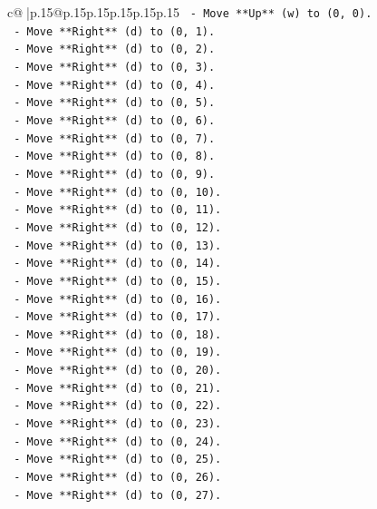 \documentclass{article}
\begin{document}
{\begin{supertabular}{c@{$\;$}|p{.15\linewidth}@{}p{.15\linewidth}p{.15\linewidth}p{.15\linewidth}p{.15\linewidth}p{.15\linewidth}}
{{{\texttt{        {-} Move **Up** (w) to (0, 0).} \\
\texttt{        {-} Move **Right** (d) to (0, 1).} \\
\texttt{        {-} Move **Right** (d) to (0, 2).} \\
\texttt{        {-} Move **Right** (d) to (0, 3).} \\
\texttt{        {-} Move **Right** (d) to (0, 4).} \\
\texttt{        {-} Move **Right** (d) to (0, 5).} \\
\texttt{        {-} Move **Right** (d) to (0, 6).} \\
\texttt{        {-} Move **Right** (d) to (0, 7).} \\
\texttt{        {-} Move **Right** (d) to (0, 8).} \\
\texttt{        {-} Move **Right** (d) to (0, 9).} \\
\texttt{        {-} Move **Right** (d) to (0, 10).} \\
\texttt{        {-} Move **Right** (d) to (0, 11).} \\
\texttt{        {-} Move **Right** (d) to (0, 12).} \\
\texttt{        {-} Move **Right** (d) to (0, 13).} \\
\texttt{        {-} Move **Right** (d) to (0, 14).} \\
\texttt{        {-} Move **Right** (d) to (0, 15).} \\
\texttt{        {-} Move **Right** (d) to (0, 16).} \\
\texttt{        {-} Move **Right** (d) to (0, 17).} \\
\texttt{        {-} Move **Right** (d) to (0, 18).} \\
\texttt{        {-} Move **Right** (d) to (0, 19).} \\
\texttt{        {-} Move **Right** (d) to (0, 20).} \\
\texttt{        {-} Move **Right** (d) to (0, 21).} \\
\texttt{        {-} Move **Right** (d) to (0, 22).} \\
\texttt{        {-} Move **Right** (d) to (0, 23).} \\
\texttt{        {-} Move **Right** (d) to (0, 24).} \\
\texttt{        {-} Move **Right** (d) to (0, 25).} \\
\texttt{        {-} Move **Right** (d) to (0, 26).} \\
\texttt{        {-} Move **Right** (d) to (0, 27).} \\
}}}
\end{supertabular}}
\end{document}
